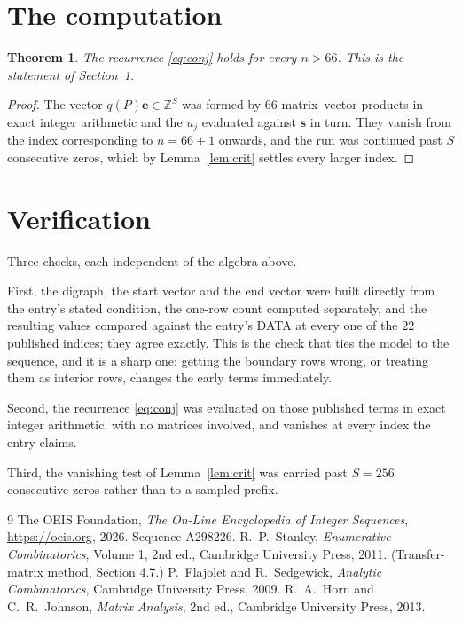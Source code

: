 \documentclass[11pt,a4paper]{article}
\theoremstyle{plain}
\newtheorem{theorem}{Theorem}
\theoremstyle{definition}
\begin{document}
\section{The computation}

\begin{theorem}
The recurrence \eqref{eq:conj} holds for every $n>66$. This is the statement of
Section~1.
\end{theorem}

\begin{proof}
The vector $q(P)\mathbf{e}\in\mathbb{Z}^{S}$ was formed by $66$ matrix--vector
products in exact integer arithmetic and the $u_j$ evaluated against $\mathbf{s}$ in turn.
They vanish from the index corresponding to $n=66+1$ onwards, and the run was continued
past $S$ consecutive zeros, which by Lemma~\ref{lem:crit} settles every larger index.
\end{proof}

\section{Verification}

Three checks, each independent of the algebra above.

First, the digraph, the start vector and the end vector were built directly from the
entry's stated condition, the one-row count computed separately, and the resulting values
compared against the entry's DATA at every one of the $22$ published indices; they
agree exactly. This is the check that ties the model to the sequence, and it is a sharp one:
getting the boundary rows wrong, or treating them as interior rows, changes the early terms
immediately.

Second, the recurrence \eqref{eq:conj} was evaluated on those published terms in exact
integer arithmetic, with no matrices involved, and vanishes at every index the entry claims.

Third, the vanishing test of Lemma~\ref{lem:crit} was carried past $S=256$ consecutive
zeros rather than to a sampled prefix.

\begin{thebibliography}{9}
 The OEIS Foundation, \emph{The On-Line Encyclopedia of Integer
Sequences}, \url{https://oeis.org}, 2026. Sequence A298226.
 R.~P.~Stanley, \emph{Enumerative Combinatorics}, Volume 1, 2nd ed.,
Cambridge University Press, 2011. (Transfer-matrix method, Section 4.7.)
 P.~Flajolet and R.~Sedgewick, \emph{Analytic Combinatorics}, Cambridge
University Press, 2009.
 R.~A.~Horn and C.~R.~Johnson, \emph{Matrix Analysis}, 2nd ed., Cambridge
University Press, 2013.
\end{thebibliography}
\end{document}
